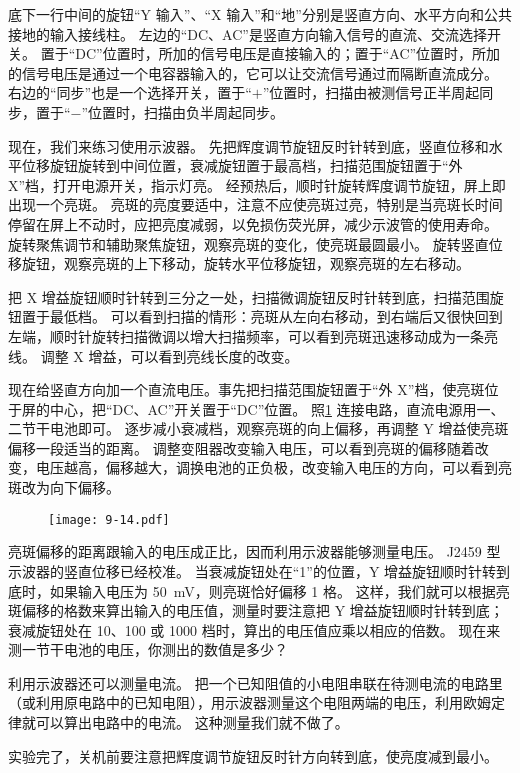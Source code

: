 底下一行中间的旋钮“Y 输入”、“X 输入”和“地”分别是竖直方向、水平方向和公共接地的输入接线柱。
左边的“DC、AC”是竖直方向输入信号的直流、交流选择开关。
置于“DC”位置时，所加的信号电压是直接输入的；置于“AC”位置时，所加的信号电压是通过一个电容器输入的，它可以让交流信号通过而隔断直流成分。
右边的“同步”也是一个选择开关，置于“$+$”位置时，扫描由被测信号正半周起同步，置于“$-$”位置时，扫描由负半周起同步。

现在，我们来练习使用示波器。
先把辉度调节旋钮反时针转到底，竖直位移和水平位移旋钮旋转到中间位置，衰减旋钮置于最高档，扫描范围旋钮置于“外 X”档，打开电源开关，指示灯亮。
经预热后，顺时针旋转辉度调节旋钮，屏上即出现一个亮斑。
亮斑的亮度要适中，注意不应使亮斑过亮，特别是当亮斑长时间停留在屏上不动时，应把亮度减弱，以免损伤荧光屏，减少示波管的使用寿命。
旋转聚焦调节和辅助聚焦旋钮，观察亮斑的变化，使亮斑最圆最小。
旋转竖直位移旋钮，观察亮斑的上下移动，旋转水平位移旋钮，观察亮斑的左右移动。

把 X 增益旋钮顺时针转到三分之一处，扫描微调旋钮反时针转到底，扫描范围旋钮置于最低档。
可以看到扫描的情形：亮斑从左向右移动，到右端后又很快回到左端，顺时针旋转扫描微调以增大扫描频率，可以看到亮斑迅速移动成为一条亮线。
调整 X 增益，可以看到亮线长度的改变。

现在给竖直方向加一个直流电压。事先把扫描范围旋钮置于“外 X”档，使亮斑位于屏的中心，把“DC、AC”开关置于“DC”位置。
照\cref{fig:9-14} 连接电路，直流电源用一、二节干电池即可。
逐步减小衰减档，观察亮斑的向上偏移，再调整 Y 增益使亮斑偏移一段适当的距离。
调整变阻器改变输入电压，可以看到亮斑的偏移随着改变，电压越高，偏移越大，调换电池的正负极，改变输入电压的方向，可以看到亮斑改为向下偏移。
\begin{figure}
  \texttt{[image: 9-14.pdf]}
  \caption{}\label{fig:9-14}
\end{figure}

亮斑偏移的距离跟输入的电压成正比，因而利用示波器能够测量电压。
J2459 型示波器的竖直位移已经校准。
当衰减旋钮处在“1”的位置，Y 增益旋钮顺时针转到底时，如果输入电压为 \qty{50}{mV}，则亮斑恰好偏移 1 格。
这样，我们就可以根据亮斑偏移的格数来算出输入的电压值，测量时要注意把 Y 增益旋钮顺时针转到底；衰减旋钮处在 10、100 或 1000 档时，算出的电压值应乘以相应的倍数。
现在来测一节干电池的电压，你测出的数值是多少？

利用示波器还可以测量电流。
把一个已知阻值的小电阻串联在待测电流的电路里（或利用原电路中的已知电阻），用示波器测量这个电阻两端的电压，利用欧姆定律就可以算出电路中的电流。
这种测量我们就不做了。

实验完了，关机前要注意把辉度调节旋钮反时针方向转到底，使亮度减到最小。
